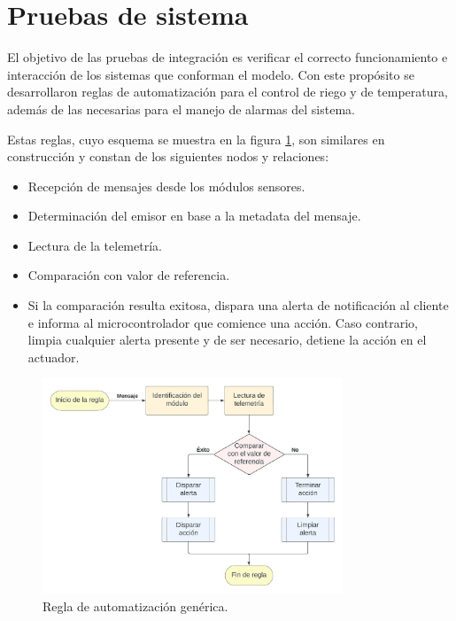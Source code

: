 \section{Pruebas de sistema}
\label{sec:Pruebas de sistema}

El objetivo de las pruebas de integración es verificar el correcto funcionamiento e interacción de los sistemas que conforman el modelo. Con este propósito se desarrollaron reglas de automatización para el control de riego y de temperatura, además de las necesarias para el manejo de alarmas del sistema. 

Estas reglas, cuyo esquema se muestra en la figura \ref{fig:basic_rule}, son similares en construcción y constan de los siguientes nodos y relaciones:

\begin{itemize}
\item Recepción de mensajes desde los módulos sensores.
\item Determinación del emisor en base a la metadata del mensaje.
\item Lectura de la telemetría.
\item Comparación con valor de referencia.
\item[] Si la comparación resulta exitosa, dispara una alerta de notificación al cliente e informa al microcontrolador que comience una acción. Caso contrario, limpia cualquier alerta presente y de ser necesario, detiene la acción en el actuador.
\end{itemize}





\begin{figure}[h]
	\centering
	\includegraphics[width=0.8\textwidth]{./Figures/chapter4/ReglaBasica.jpg}
	\caption[Regla de automatización genérica]{Regla de automatización genérica.}
	\label{fig:basic_rule}
\end{figure}

